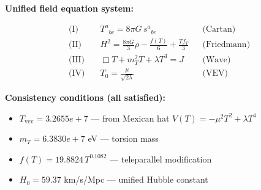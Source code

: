 
\textbf{Unified field equation system:}

\begin{align}
  \text{(I)} \quad & T^a{}_{bc} = 8\pi G \, s^a{}_{bc} && \text{(Cartan)} \\
  \text{(II)} \quad & H^2 = \frac{8\pi G}{3}\rho - \frac{f(T)}{6} + \frac{Tf_T}{3} && \text{(Friedmann)} \\
  \text{(III)} \quad & \Box T + m_T^2 T + \lambda T^3 = J && \text{(Wave)} \\
  \text{(IV)} \quad & T_0 = \frac{\mu}{\sqrt{2\lambda}} && \text{(VEV)}
\end{align}

\textbf{Consistency conditions (all satisfied):}
\begin{itemize}
  \item $T_{\text{vev}} = 3.2655e+7$ — from Mexican hat $V(T) = -\mu^2 T^2 + \lambda T^4$
  \item $m_T = 6.3830e+7$ eV — torsion mass
  \item $f(T) = 19.8824 \, T^{0.1082}$ — teleparallel modification
  \item $H_0 = 59.37$ km/s/Mpc — unified Hubble constant
\end{itemize}
